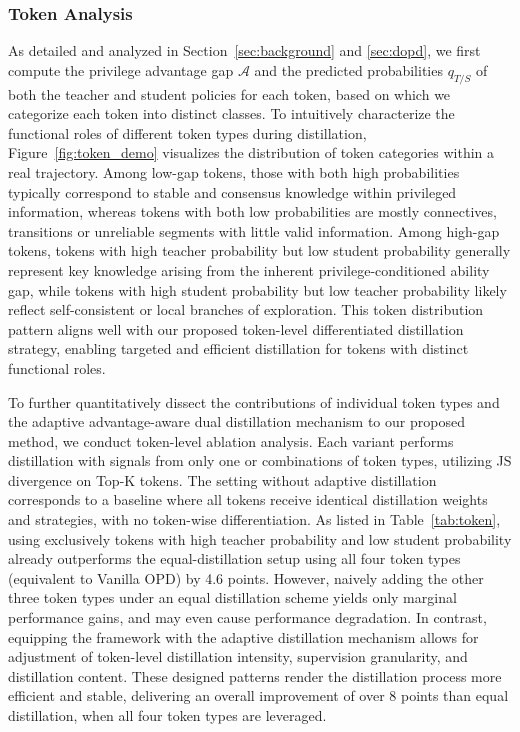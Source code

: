 \documentclass[]{jingdong}
\theoremstyle{plain}
\theoremstyle{definition}
\theoremstyle{remark}
\begin{document}
\subsubsection{Token Analysis}
As detailed and analyzed in Section~\ref{sec:background} and \ref{sec:dopd}, we first compute the privilege advantage gap $\mathcal{A}$ and the predicted probabilities $q_{T/S}$ of both the teacher and student policies for each token, based on which we categorize each token into distinct classes.
To intuitively characterize the functional roles of different token types during distillation, Figure~\ref{fig:token_demo} visualizes the distribution of token categories within a real trajectory.
Among low-gap tokens, those with both high probabilities typically correspond to stable and consensus knowledge within privileged information, whereas tokens with both low probabilities are mostly connectives, transitions or unreliable segments with little valid information.
Among high-gap tokens, tokens with high teacher probability but low student probability generally represent key knowledge arising from the inherent privilege-conditioned ability gap, while tokens with high student probability but low teacher probability likely reflect self-consistent or local branches of exploration.
This token distribution pattern aligns well with our proposed token-level differentiated distillation strategy, enabling targeted and efficient distillation for tokens with distinct functional roles.






To further quantitatively dissect the contributions of individual token types and the adaptive advantage-aware dual distillation mechanism to our proposed method, we conduct token-level ablation analysis.
Each variant performs distillation with signals from only one or combinations of token types, utilizing JS divergence on Top-K tokens. The setting without adaptive distillation corresponds to a baseline where all tokens receive identical distillation weights and strategies, with no token-wise differentiation.
As listed in Table~\ref{tab:token}, using exclusively tokens with high teacher probability and low student probability already outperforms the equal-distillation setup using all four token types (equivalent to Vanilla OPD) by 4.6 points.
However, naively adding the other three token types under an equal distillation scheme yields only marginal performance gains, and may even cause performance degradation.
In contrast, equipping the framework with the adaptive distillation mechanism allows for adjustment of token-level distillation intensity, supervision granularity, and distillation content. These designed patterns render the distillation process more efficient and stable, delivering an overall improvement of over 8 points than equal distillation, when all four token types are leveraged.
\end{document}
